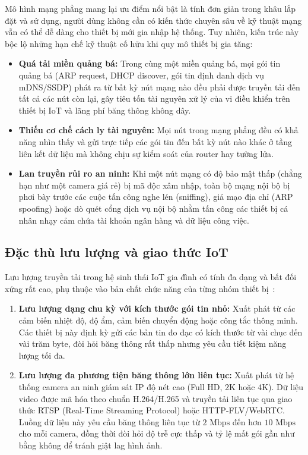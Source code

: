 Mô hình mạng phẳng mang lại ưu điểm nổi bật là tính đơn giản trong khâu lắp đặt và sử dụng, người dùng không cần có kiến thức chuyên sâu về kỹ thuật mạng vẫn có thể dễ dàng cho thiết bị mới gia nhập hệ thống. Tuy nhiên, kiến trúc này bộc lộ những hạn chế kỹ thuật cố hữu khi quy mô thiết bị gia tăng:
\begin{itemize}
    \item \textbf{Quá tải miền quảng bá:} Trong cùng một miền quảng bá, mọi gói tin quảng bá (ARP request, DHCP discover, gói tin định danh dịch vụ mDNS/SSDP) phát ra từ bất kỳ nút mạng nào đều phải được truyền tải đến tất cả các nút còn lại, gây tiêu tốn tài nguyên xử lý của vi điều khiển trên thiết bị IoT và lãng phí băng thông không dây.
    \item \textbf{Thiếu cơ chế cách ly tài nguyên:} Mọi nút trong mạng phẳng đều có khả năng nhìn thấy và gửi trực tiếp các gói tin đến bất kỳ nút nào khác ở tầng liên kết dữ liệu mà không chịu sự kiểm soát của router hay tường lửa.
    \item \textbf{Lan truyền rủi ro an ninh:} Khi một nút mạng có độ bảo mật thấp (chẳng hạn như một camera giá rẻ) bị mã độc xâm nhập, toàn bộ mạng nội bộ bị phơi bày trước các cuộc tấn công nghe lén (sniffing), giả mạo địa chỉ (ARP spoofing) hoặc dò quét cổng dịch vụ nội bộ nhằm tấn công các thiết bị cá nhân nhạy cảm chứa tài khoản ngân hàng và dữ liệu công việc.
\end{itemize}

\subsection{Đặc thù lưu lượng và giao thức IoT}
\label{subsec:dac-thu-luu-luong-giao-thuc-iot}

Lưu lượng truyền tải trong hệ sinh thái IoT gia đình có tính đa dạng và bất đối xứng rất cao, phụ thuộc vào bản chất chức năng của từng nhóm thiết bị~\cite{alfuqaha2015internet}:
\begin{enumerate}
    \item \textbf{Lưu lượng dạng chu kỳ với kích thước gói tin nhỏ:} Xuất phát từ các cảm biến nhiệt độ, độ ẩm, cảm biến chuyển động hoặc công tắc thông minh. Các thiết bị này định kỳ gửi các bản tin đo đạc có kích thước từ vài chục đến vài trăm byte, đòi hỏi băng thông rất thấp nhưng yêu cầu tiết kiệm năng lượng tối đa.
    \item \textbf{Lưu lượng đa phương tiện băng thông lớn liên tục:} Xuất phát từ hệ thống camera an ninh giám sát IP độ nét cao (Full HD, 2K hoặc 4K). Dữ liệu video được mã hóa theo chuẩn H.264/H.265 và truyền tải liên tục qua giao thức RTSP (Real-Time Streaming Protocol) hoặc HTTP-FLV/WebRTC. Luồng dữ liệu này yêu cầu băng thông liên tục từ $2\text{ Mbps}$ đến hơn $10\text{ Mbps}$ cho mỗi camera, đồng thời đòi hỏi độ trễ cực thấp và tỷ lệ mất gói gần như bằng không để tránh giật lag hình ảnh.
\end{enumerate}

